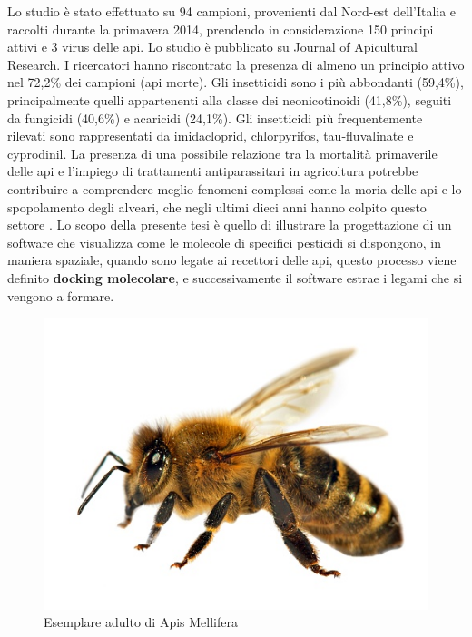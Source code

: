 Lo studio è stato effettuato su 94 campioni, provenienti dal Nord-est dell’Italia e raccolti durante la primavera 2014, prendendo in considerazione 150 principi attivi e 3 virus delle api. Lo studio è pubblicato su Journal of Apicultural Research. I ricercatori hanno riscontrato la presenza di almeno un principio attivo nel 72,2\% dei campioni (api morte). Gli insetticidi sono i più abbondanti (59,4\%), principalmente quelli appartenenti alla classe dei neonicotinoidi (41,8\%), seguiti da fungicidi (40,6\%) e acaricidi (24,1\%). Gli insetticidi più frequentemente rilevati sono rappresentati da imidacloprid, chlorpyrifos, tau-fluvalinate e cyprodinil.\newline
La presenza di una possibile relazione tra la mortalità primaverile delle api e l’impiego di trattamenti antiparassitari in agricoltura potrebbe contribuire a comprendere meglio fenomeni complessi come la moria delle api e lo spopolamento degli alveari, che negli ultimi dieci anni hanno colpito questo settore \cite{martinello2017spring}.\newline
Lo scopo della presente tesi è quello di illustrare la progettazione di un software che visualizza come le molecole di specifici pesticidi si dispongono, in maniera spaziale, quando sono legate ai recettori delle api, questo processo viene definito \textbf{docking molecolare}, e successivamente il software estrae i legami che si vengono a formare.

\begin{figure}[H]
    \centering
    \includegraphics{immagini/apisMellifera.png}
    \caption{Esemplare adulto di Apis Mellifera}
    \label{fig:Apis Mellifera}
\end{figure}

